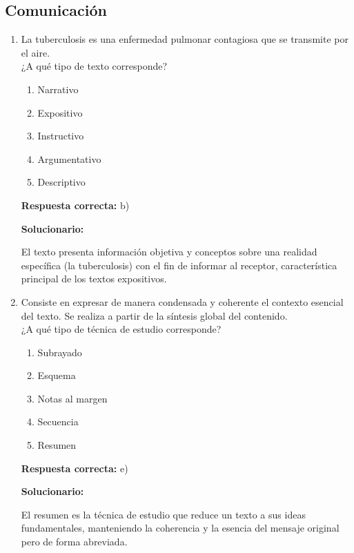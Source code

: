 \subsection*{Comunicación}

\begin{enumerate}[resume]

	\item La tuberculosis es una enfermedad pulmonar contagiosa que se transmite por el aire. \\ ¿A qué tipo de texto corresponde?
	\begin{enumerate}[label=\alph*)]
		\item Narrativo
		\item Expositivo
		\item Instructivo
		\item Argumentativo
		\item Descriptivo
	\end{enumerate}
	\textbf{Respuesta correcta:} b)

	\vspace{2mm}
	\textbf{Solucionario:}

	El texto presenta información objetiva y conceptos sobre una realidad específica (la tuberculosis) con el fin de informar al receptor, característica principal de los textos expositivos.

	\vspace{6mm}

	\item Consiste en expresar de manera condensada y coherente el contexto esencial del texto. Se realiza a partir de la síntesis global del contenido. \\ ¿A qué tipo de técnica de estudio corresponde?
	\begin{enumerate}[label=\alph*)]
		\item Subrayado
		\item Esquema
		\item Notas al margen
		\item Secuencia
		\item Resumen
	\end{enumerate}
	\textbf{Respuesta correcta:} e)

	\vspace{2mm}
	\textbf{Solucionario:}

	El resumen es la técnica de estudio que reduce un texto a sus ideas fundamentales, manteniendo la coherencia y la esencia del mensaje original pero de forma abreviada.

	\vspace{6mm}


\end{enumerate}
